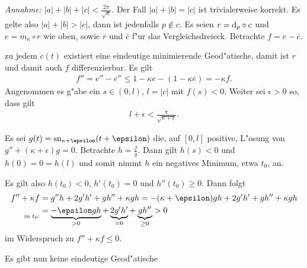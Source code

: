\begin{emptythm}
  \emph{Annahme:} $|a| + |b| + |c| < \frac{2\pi}{\sqrt{\kappa}}$.
  Der Fall $|a| + |b| = |c|$ ist trivialerweise korrekt.
  Es gelte also $|a| + |b| > |c|$, dann ist jedenfalls $p \notin c$.
  Es seien $r = \mathrm{d}_p \circ c$ und $e = m_{\kappa} \circ r$ wie oben, sowie $\overline r$ und $\overline c$ f"ur das Vergleichsdreieck.
  Betrachte $f = e - \overline e$.
  \begin{description}[font=\normalfont\bfseries]
  \item[Fall 1:] zu jedem $c(t)$ existiert eine eindeutige minimierende Geod"atische, damit ist $r$ und damit auch $f$ differenzierbar.
    Es gilt
    \begin{align*}
      f'' = e'' - \overline e''
      \leq 1 - \kappa e - (1-\kappa \overline e) = -\kappa f.
    \end{align*}
    Angenommen es g"abe ein $s \in (0,l)$, $l = |c|$ mit $f(s) < 0$.
    Weiter sei $\epsilon > 0$ so, dass gilt
    \begin{align*}
      l + \epsilon < \frac{\pi}{\sqrt{\kappa + \epsilon}}.
    \end{align*}
    
    Es sei $g(t) = \sn_{\kappa + \epsilon}(t + \epsilon)$ die, auf $[0,l]$ positive, L"osung von $g'' +(\kappa + \epsilon)g = 0$.
    Betrachte $h = \frac{f}{g}$.
    Dann gilt $h(s) < 0$ und $h(0) = 0 = h(l)$ und somit nimmt $h$ ein negatives Minimum, etwa $t_0$, an.
    
    Es gilt also $h(t_0) < 0$, $h'(t_0) = 0$ und $h''(t_0) \geq 0$.
    Dann folgt
    \begin{align*}
      f'' + \kappa f & = g'' h + 2 g'h' + gh'' + \kappa g h = -(\kappa + \epsilon)gh + 2 g'h' + gh'' + \kappa g h\\
      \underset{\text{in } t_0:}{\hphantom{}} & = \underbrace{-\epsilon g h}_{> 0} + \underbrace{2 g' h'}_{= 0} + \underbrace{gh''}_{\geq 0} > 0
    \end{align*}
    im Widerspruch zu $f'' + \kappa f \leq 0$.
  \item[Fall 1 gilt nicht:] Es gibt nun keine eindeutige Geod"atische
    \begin{center}
\end{center}
\end{description}
\end{emptythm}
